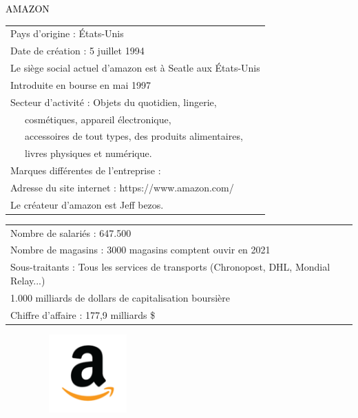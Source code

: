 \documentclass[12pt]{article}
\begin{document}
\begin{center}
\Huge
               \colorbox[RGB]{248,157,48}{ \textcolor{black}{AMAZON}}
\normalsize
    \end{center}


\begin{multicols}{2}
\begin{tabular}{l}
 \rowcolor[RGB]{248,157,48} Pays d'origine : \'Etats-Unis \\
      \rowcolor[RGB]{248,157,48} Date de création : 5 juillet 1994 \\
      \rowcolor[RGB]{248,157,48}Le siège social actuel d'amazon est à Seatle aux \'Etats-Unis\\
      \rowcolor[RGB]{248,157,48} Introduite en bourse en mai 1997\\
      \rowcolor[RGB]{248,157,48} Secteur d'activité : Objets du quotidien, lingerie,\\
      \rowcolor[RGB]{248,157,48} ~~~cosmétiques, appareil électronique,\\
      \rowcolor[RGB]{248,157,48} ~~~accessoires de tout types, des produits alimentaires,\\
      \rowcolor[RGB]{248,157,48} ~~~livres physiques et numérique.\\
      \rowcolor[RGB]{248,157,48} Marques différentes de l'entreprise : \\
      \rowcolor[RGB]{248,157,48}Adresse du site internet : https://www.amazon.com/ \\
      \rowcolor[RGB]{248,157,48} Le créateur d'amazon est Jeff bezos. \\

\end{tabular}
\begin{tabular}{l}
 \rowcolor[RGB]{248,157,48}   Nombre de salariés : 647.500\\
 \rowcolor[RGB]{248,157,48}   Nombre de magasins : 3000 magasins comptent ouvir en 2021\\
 \rowcolor[RGB]{248,157,48}   Sous-traitants : Tous les services de transports (Chronopost, DHL, Mondial Relay...) \\
 \rowcolor[RGB]{248,157,48}   1.000 milliards de dollars de capitalisation boursière \\
 \rowcolor[RGB]{248,157,48}   Chiffre d'affaire : 177,9 milliards \$ \\
\end{tabular}
\begin{center}
~~~~~~~~~\includegraphics[width=3cm]{120px-Amazon_icon.png}
\end{center}
\end{multicols}
\end{document}
